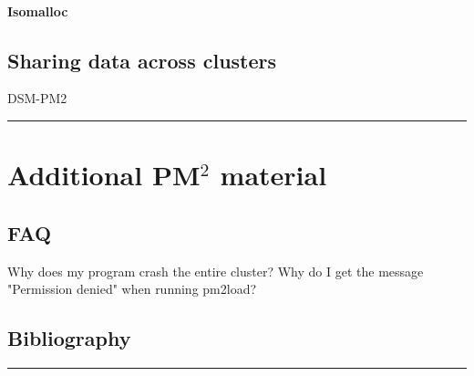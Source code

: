 \documentclass[a4paper,11pt]{report}
\def\pm2{PM$^2$\xspace}
\def\endchap{\vspace{2cm}\begin{center}\rule{6cm}{1mm}\end{center}}
\begin{document}
\subsubsection{Isomalloc}


\section{Sharing data across clusters}
        DSM-PM2
\endchap

\chapter{Additional \pm2 material}

\section{FAQ}
        Why does my program crash the entire cluster?
        Why do I get the message "Permission denied" when running pm2load?


\section{Bibliography}
    
\endchap
            
\end{document}
